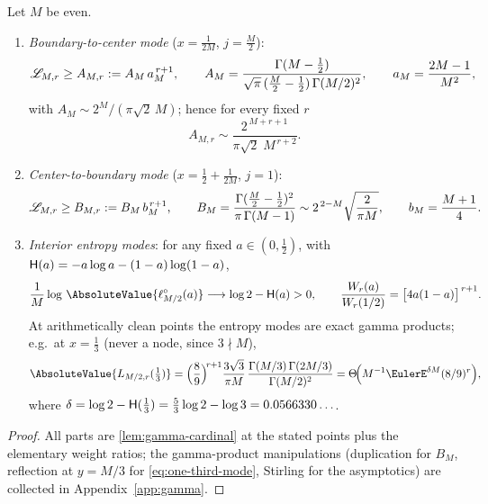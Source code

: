 \begin{proposition}
\label{prop:modes}
Let $M$ be even.
\begin{enumerate}
\item\emph{Boundary-to-center mode} ($x=\tfrac1{2M}$, $j=\tfrac M2$):
\begin{equation}
 \mathscr L_{M,r}\ge A_{M,r}:=A_M\,a_M^{\,r+1},
 \qquad
 A_M=\frac{\Gamma(M-\tfrac12)}
 {\sqrt\pi\,(\tfrac M2-\tfrac12)\,\Gamma(M/2)^{2}},
 \qquad
 a_M=\frac{2M-1}{M^{2}},
 \label{eq:A-mode}
\end{equation}
with $A_M\sim2^{M}/(\pi\sqrt2\,M)$; hence for every fixed $r$
\begin{equation}
 A_{M,r}\sim\frac{2^{\,M+r+1}}{\pi\sqrt2\;M^{\,r+2}}.
 \label{eq:A-asymptotic}
\end{equation}
\item\emph{Center-to-boundary mode} ($x=\tfrac12+\tfrac1{2M}$,
$j=1$):
\begin{equation}
 \mathscr L_{M,r}\ge B_{M,r}:=B_M\,b_M^{\,r+1},
 \qquad
 B_M=\frac{\Gamma(\tfrac M2-\tfrac12)^{2}}{\pi\,\Gamma(M-1)}
 \sim2^{\,2-M}\sqrt{\frac{2}{\pi M}},
 \qquad
 b_M=\frac{M+1}{4}.
 \label{eq:B-mode}
\end{equation}
\item\emph{Interior entropy modes}: for any fixed $a\in(0,\tfrac12)$,
with $\mathsf H(a)=-a\log a-(1-a)\log(1-a)$,
\begin{equation}
 \frac1M\log\,\AbsoluteValue{\ell^{\circ}_{M/2}(a)}
 \longrightarrow\log2-\Hyp(a)>0,
 \qquad
 \frac{W_r(a)}{W_r(1/2)}=\bigl[4a(1-a)\bigr]^{\,r+1}.
 \label{eq:entropy-mode}
\end{equation}
At arithmetically clean points the entropy modes are exact gamma
products; e.g.\ at $x=\tfrac13$ (never a node, since $3\nmid M$),
\begin{equation}
 \AbsoluteValue{L_{M/2,r}(\tfrac13)}
 =\Bigl(\frac89\Bigr)^{\!r+1}
 \frac{3\sqrt3}{\pi M}\,
 \frac{\Gamma(M/3)\,\Gamma(2M/3)}{\Gamma(M/2)^{2}}
 =\Theta\!\Bigl(M^{-1}\EulerE^{\delta M}(8/9)^{r}\Bigr),
 \label{eq:one-third-mode}
\end{equation}
where $\delta=\log2-\mathsf H(\tfrac13)=\tfrac53\log2-\log3
=0.0566330\ldots$.
\end{enumerate}
\end{proposition}

\begin{proof}
All parts are \cref{lem:gamma-cardinal} at the stated points plus the
elementary weight ratios; the gamma-product manipulations
(duplication for $B_M$, reflection at $y=M/3$ for
\eqref{eq:one-third-mode}, Stirling for the asymptotics) are collected
in Appendix~\ref{app:gamma}.
\end{proof}

